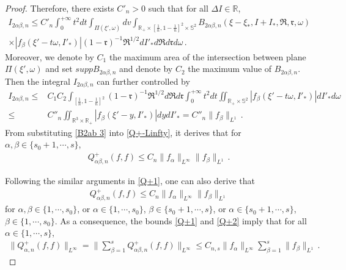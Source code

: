 \documentclass[reqno,11pt]{amsart}
\numberwithin{equation}{section}
\def\R{\mathbb{R}}
\begin{document}
\begin{proof}
Therefore, there exists $C'_n > 0$ such that for all $\Delta I \in \R$,
\begin{equation*}
\begin{aligned}
I_{2 \alpha \beta, n} \leq C'_n \int_0^{+\infty} t^2 dt \int_{\Pi (\xi' ,\omega )}  dv \int_{\R_+ \times [\frac{1}{n},1-\frac{1}{n}]^2 \times \mathbb{S}^2 } B_{2\alpha \beta ,n} (\xi-\xi_*,I+I_*,\mathfrak{R},\mathfrak{r},\omega ) \\
\times | f_{\beta }(\xi'-t\omega ,I'_*) | (1-\mathfrak{r})^{-1}\mathfrak{R}^{1/2} dI'_* d\mathfrak{R}d\mathfrak{r}d\omega \,.
\end{aligned}
\end{equation*}	
Moreover, we denote by $C_1$ the maximum area of the intersection between plane $\Pi (\xi',\omega )$ and set $supp B_{2 \alpha \beta ,n}$ and denote by $ C_2$ the maximum value of $B_{2\alpha \beta ,n}$. Then the integral $I_{2 \alpha \beta, n}$ can further controlled by
\begin{equation}\label{B2ab 3}
\begin{aligned}
I_{2 \alpha \beta, n} \leq & C_1 C_2 \int_{[\frac{1}{n},1-\frac{1}{n}]^2} (1-\mathfrak{r})^{-1}\mathfrak{R}^{1/2} d \mathfrak{R} d \mathfrak{r} \int_{0}^{+\infty} t^2 dt\iint_{\R_+  \times \mathbb{S}^2 } | f_{\beta }(\xi'-t\omega ,I'_*) | d I'_* d \omega \\
\leq & C''_n \iint_{\R^3 \times \R_+} | f_{\beta }(\xi'- y ,I'_*) | d y dI'_* = C''_n \| f_\beta \|_{L^1} \,.
\end{aligned}
\end{equation}	
From substituting \eqref{B2ab 3} into \eqref{Q+-Linfty}, it derives that for $\alpha, \beta \in \{ s_0 + 1, \cdots, s \}$,
\begin{equation}\label{Q+1}
\begin{aligned}
Q_{\alpha \beta, n}^+ (f,f) \leq C_n \| f_\alpha \|_{L^\infty} \| f_\beta \|_{L^1} \,.
\end{aligned}
\end{equation}	

Following the similar arguments in \eqref{Q+1}, one can also derive that
\begin{equation}\label{Q+2}
\begin{aligned}
Q_{\alpha \beta, n}^+ (f,f) \leq C_n \| f_\alpha \|_{L^\infty} \| f_\beta \|_{L^1}
\end{aligned}
\end{equation}
for $\alpha, \beta \in \{ 1, \cdots, s_0 \}$, or $\alpha \in \{ 1, \cdots, s_0 \}$, $\beta \in \{ s_0 + 1, \cdots, s \}$, or $\alpha \in \{ s_0 + 1, \cdots, s \}$, $\beta \in \{ 1, \cdots, s_0 \}$. As a consequence, the bounds \eqref{Q+1} and \eqref{Q+2} imply that for all $\alpha \in \{ 1, \cdots, s \}$,
\begin{equation}\label{Q+alpha-n-bnd}
  \begin{aligned}
    \| Q_{\alpha, n}^+ (f,f) \|_{L^\infty} = \| \sum_{\beta = 1}^{s} Q_{\alpha \beta, n}^+ (f,f) \|_{L^\infty} \leq C_{n,s} \| f_\alpha \|_{L^\infty} \sum_{\beta = 1}^{s} \| f_\beta \|_{L^1} \,.
  \end{aligned}
\end{equation}


\end{proof}
\end{document}
